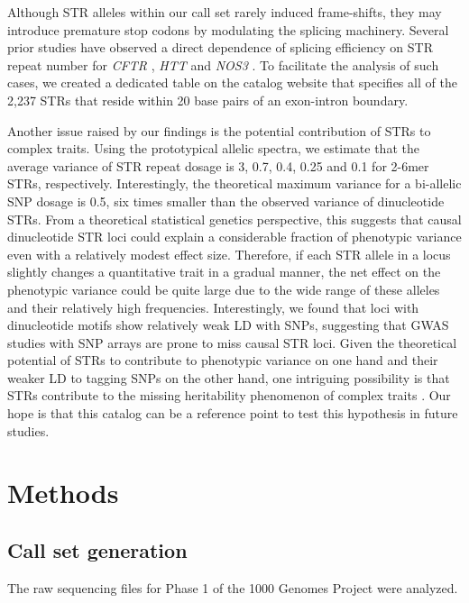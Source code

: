 Although STR alleles within our call set rarely induced frame-shifts, they may introduce premature stop codons by modulating the splicing machinery. Several prior studies have observed a direct dependence of splicing efficiency on STR repeat number for \emph{CFTR} \cite{HefferonGromanYurkEtAl2004}, \emph{HTT} \cite{SathasivamNeuederGipsonEtAl2013} and \emph{NOS3} \cite{HuiStanglLaneEtAl2003}. To facilitate the analysis of such cases, we created a dedicated table on the catalog website that specifies all of the 2,237 STRs that reside within 20 base pairs of an exon-intron boundary.  

Another issue raised by our findings is the potential contribution of STRs to complex traits. Using the prototypical allelic spectra, we estimate that the average variance of STR repeat dosage is 3, 0.7, 0.4, 0.25 and 0.1 for 2-6mer STRs, respectively. Interestingly, the theoretical maximum variance for a bi-allelic SNP dosage is 0.5, six times smaller than the observed variance of dinucleotide STRs. From a theoretical statistical genetics perspective, this suggests that causal dinucleotide STR loci could explain a considerable fraction of phenotypic variance even with a relatively modest effect size. Therefore, if each STR allele in a locus slightly changes a quantitative trait in a gradual manner, the net effect on the phenotypic variance could be quite large due to the wide range of these alleles and their relatively high frequencies. Interestingly, we found that loci with dinucleotide motifs show relatively weak LD with SNPs, suggesting that GWAS studies with SNP arrays are prone to miss causal STR loci. Given the theoretical potential of STRs to contribute to phenotypic variance on one hand and their weaker LD to tagging SNPs on the other hand, one intriguing possibility is that STRs contribute to the missing heritability phenomenon of complex traits \cite{ManolioCollinsCoxEtAl2009,PressCarlsonQueitsch2014}. Our hope is that this catalog can be a reference point to test this hypothesis in future studies.  

\section{Methods}
\label{sec:catmet}

\subsection{Call set generation}
The raw sequencing files for Phase 1 of the 1000 Genomes Project were analyzed.

